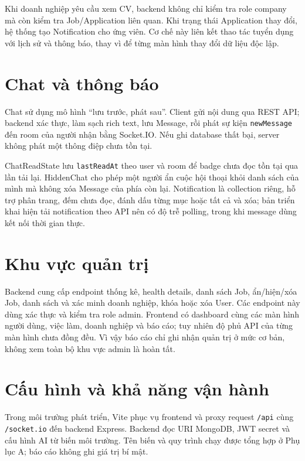 Khi doanh nghiệp yêu cầu xem CV, backend không chỉ kiểm tra role company mà còn kiểm tra Job/Application liên quan. Khi trạng thái Application thay đổi, hệ thống tạo Notification cho ứng viên. Cơ chế này liên kết thao tác tuyển dụng với lịch sử và thông báo, thay vì để từng màn hình thay đổi dữ liệu độc lập.

\section{Chat và thông báo}

Chat sử dụng mô hình ``lưu trước, phát sau''. Client gửi nội dung qua REST API; backend xác thực, làm sạch rich text, lưu Message, rồi phát sự kiện \texttt{newMessage} đến room của người nhận bằng Socket.IO. Nếu ghi database thất bại, server không phát một thông điệp chưa tồn tại.

ChatReadState lưu \texttt{lastReadAt} theo user và room để badge chưa đọc tồn tại qua lần tải lại. HiddenChat cho phép một người ẩn cuộc hội thoại khỏi danh sách của mình mà không xóa Message của phía còn lại. Notification là collection riêng, hỗ trợ phân trang, đếm chưa đọc, đánh dấu từng mục hoặc tất cả và xóa; bản triển khai hiện tải notification theo API nên có độ trễ polling, trong khi message dùng kết nối thời gian thực.

\section{Khu vực quản trị}

Backend cung cấp endpoint thống kê, health details, danh sách Job, ẩn/hiện/xóa Job, danh sách và xác minh doanh nghiệp, khóa hoặc xóa User. Các endpoint này dùng xác thực và kiểm tra role admin. Frontend có dashboard cùng các màn hình người dùng, việc làm, doanh nghiệp và báo cáo; tuy nhiên độ phủ API của từng màn hình chưa đồng đều. Vì vậy báo cáo chỉ ghi nhận quản trị ở mức cơ bản, không xem toàn bộ khu vực admin là hoàn tất.

\section{Cấu hình và khả năng vận hành}

Trong môi trường phát triển, Vite phục vụ frontend và proxy request \texttt{/api} cùng \texttt{/socket.io} đến backend Express. Backend đọc URI MongoDB, JWT secret và cấu hình AI từ biến môi trường. Tên biến và quy trình chạy được tổng hợp ở Phụ lục A; báo cáo không ghi giá trị bí mật.

